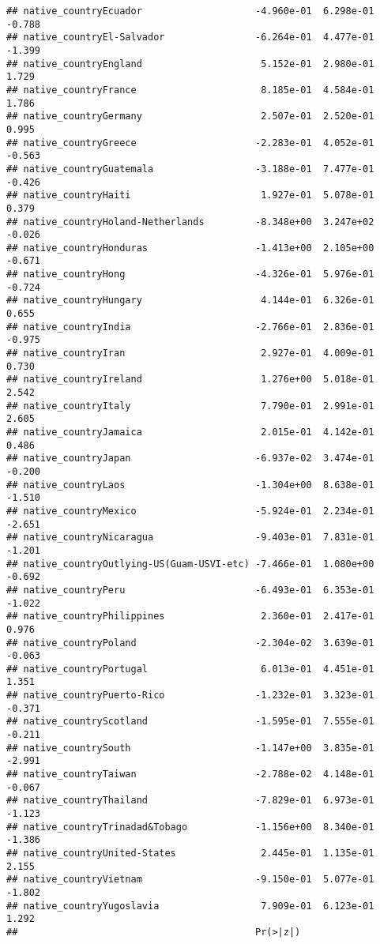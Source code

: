 \documentclass[]{article}
\begin{document}
\begin{verbatim}
## native_countryEcuador                    -4.960e-01  6.298e-01  -0.788
## native_countryEl-Salvador                -6.264e-01  4.477e-01  -1.399
## native_countryEngland                     5.152e-01  2.980e-01   1.729
## native_countryFrance                      8.185e-01  4.584e-01   1.786
## native_countryGermany                     2.507e-01  2.520e-01   0.995
## native_countryGreece                     -2.283e-01  4.052e-01  -0.563
## native_countryGuatemala                  -3.188e-01  7.477e-01  -0.426
## native_countryHaiti                       1.927e-01  5.078e-01   0.379
## native_countryHoland-Netherlands         -8.348e+00  3.247e+02  -0.026
## native_countryHonduras                   -1.413e+00  2.105e+00  -0.671
## native_countryHong                       -4.326e-01  5.976e-01  -0.724
## native_countryHungary                     4.144e-01  6.326e-01   0.655
## native_countryIndia                      -2.766e-01  2.836e-01  -0.975
## native_countryIran                        2.927e-01  4.009e-01   0.730
## native_countryIreland                     1.276e+00  5.018e-01   2.542
## native_countryItaly                       7.790e-01  2.991e-01   2.605
## native_countryJamaica                     2.015e-01  4.142e-01   0.486
## native_countryJapan                      -6.937e-02  3.474e-01  -0.200
## native_countryLaos                       -1.304e+00  8.638e-01  -1.510
## native_countryMexico                     -5.924e-01  2.234e-01  -2.651
## native_countryNicaragua                  -9.403e-01  7.831e-01  -1.201
## native_countryOutlying-US(Guam-USVI-etc) -7.466e-01  1.080e+00  -0.692
## native_countryPeru                       -6.493e-01  6.353e-01  -1.022
## native_countryPhilippines                 2.360e-01  2.417e-01   0.976
## native_countryPoland                     -2.304e-02  3.639e-01  -0.063
## native_countryPortugal                    6.013e-01  4.451e-01   1.351
## native_countryPuerto-Rico                -1.232e-01  3.323e-01  -0.371
## native_countryScotland                   -1.595e-01  7.555e-01  -0.211
## native_countrySouth                      -1.147e+00  3.835e-01  -2.991
## native_countryTaiwan                     -2.788e-02  4.148e-01  -0.067
## native_countryThailand                   -7.829e-01  6.973e-01  -1.123
## native_countryTrinadad&Tobago            -1.156e+00  8.340e-01  -1.386
## native_countryUnited-States               2.445e-01  1.135e-01   2.155
## native_countryVietnam                    -9.150e-01  5.077e-01  -1.802
## native_countryYugoslavia                  7.909e-01  6.123e-01   1.292
##                                          Pr(>|z|)    

\end{verbatim}
\end{document}
